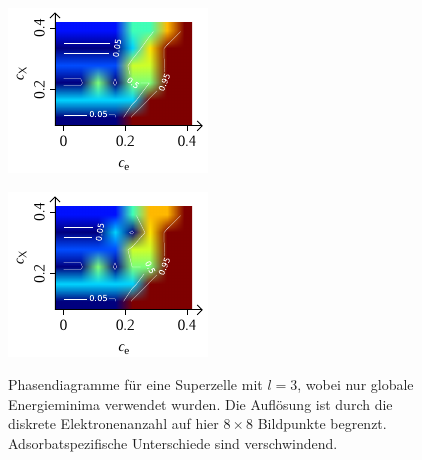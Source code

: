 \documentclass[a4paper, 10pt, twoside, openany]{book} %
\begin{document}
\begin{figure}[b]
		\begin{minipage}[t]{0.31\textwidth}
			\includegraphics[width=\textwidth]{Abbildungen/Phasendiagramme/Exakt/H_P.pdf}
			\label{HPx}
		\end{minipage}
		\hfill
		\parbox[b]{0.3\textwidth}{
			\caption[Phasendiagramme für globale Minima kleiner Systeme]{Phasendiagramme für eine Superzelle mit $l = 3$, wobei nur globale Energieminima verwendet wurden. Die Auflösung ist durch die diskrete Elektronenanzahl auf hier $8 \times 8$ Bildpunkte begrenzt. Adsorbatspezifische Unterschiede sind verschwindend.}
			\vspace{-1.5pc}
			\label{exakte Phasen}
			}
		\hfill
		\begin{minipage}[t]{0.31\textwidth}
			\includegraphics[width=\textwidth]{Abbildungen/Phasendiagramme/Exakt/F_P.pdf}
			\label{FPx}
		\end{minipage}
		

\end{figure}
\end{document}
